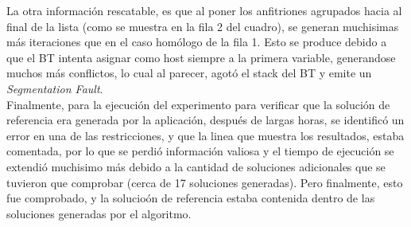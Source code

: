 \documentclass[letter, 10pt]{article}
\begin{document}
La otra información rescatable, es que al poner los anfitriones agrupados hacia al final de la lista (como se muestra en la fila 2 del cuadro), se generan muchisimas más iteraciones que en el caso homólogo de la fila 1. Esto se produce debido a que el BT intenta asignar como host siempre a la primera variable, generandose muchos más conflictos, lo cual al parecer, agotó el stack del BT y emite un \textit{Segmentation Fault}.\\


Finalmente, para la ejecución del experimento para verificar que la solución de referencia era generada por la aplicación, después de largas horas, se identificó un error en una de las restricciones, y que la linea que muestra los resultados, estaba comentada, por lo que se perdió información valiosa y el tiempo de ejecución se extendió muchisimo más debido a la cantidad de soluciones adicionales que se tuvieron que comprobar (cerca de 17 soluciones generadas). Pero finalmente, esto fue comprobado, y la solucioón de referencia estaba contenida dentro de las soluciones generadas por el algoritmo.
\end{document}
